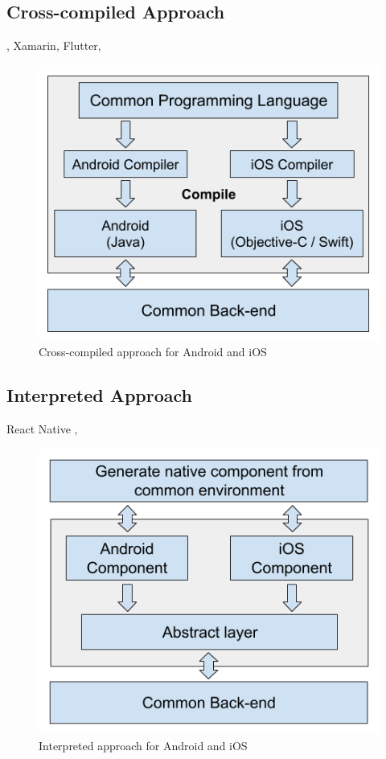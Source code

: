 \documentclass[Bachelor,BIF,english]{twbook}
\begin{document}
\subsection{Cross-compiled Approach}
\cite{7479278}, \cite{7934674} Xamarin, Flutter,
\begin{figure}[!htbp]
\centering
\includegraphics[width=0.5\linewidth]{PICs/Cross-Compiled.png}
\caption{Cross-compiled approach for Android and iOS \cite[p.~3]{7479278}}\label{Fig2}
\end{figure}

\subsection{Interpreted Approach}
React Native \cite[p.~3]{JohanssonSderberg2018}, \cite{7479278}
\begin{figure}[!htbp]
\centering
\includegraphics[width=0.5\linewidth]{PICs/Interpreted.png}
\caption{Interpreted approach for Android and iOS \cite[p.~3]{7479278}}\label{Fig3}
\end{figure}
\end{document}
